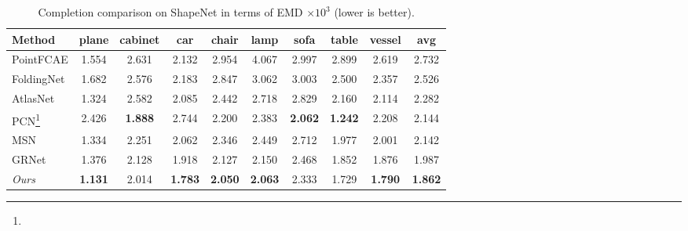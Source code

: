 \documentclass[final]{cvpr}
\begin{document}
\begin{table}
\begin{center}
\footnotesize
\setlength\tabcolsep{1.5pt}
\begin{tabular}{@{}l|cccccccc|c@{}}
\toprule
Method&plane&cabinet&car&chair&lamp&sofa&table&vessel&avg\\
\midrule
PointFCAE & 1.554 & 2.631 & 2.132 & 2.954 & 4.067 & 2.997 & 2.899 & 2.619 & 2.732\\
FoldingNet & 1.682 & 2.576 & 2.183 & 2.847 & 3.062 & 3.003 & 2.500 & 2.357 & 2.526 \\
AtlasNet & 1.324 & 2.582 & 2.085 & 2.442 & 2.718 & 2.829 & 2.160 & 2.114 & 2.282 \\
PCN\footnote{} & 2.426 & \textbf{1.888} & 2.744 & 2.200 & 2.383 & \textbf{2.062} & \textbf{1.242} & 2.208 & 2.144 \\
MSN & 1.334 & 2.251 & 2.062 & 2.346 & 2.449 & 2.712 & 1.977 & 2.001 & 2.142 \\
GRNet & 1.376 & 2.128 & 1.918 & 2.127 & 2.150 & 2.468 & 1.852 & 1.876 & 1.987 \\
\emph{Ours} & \textbf{1.131} & 2.014 & \textbf{1.783} & \textbf{2.050} & \textbf{2.063} & 2.333 & 1.729 & \textbf{1.790} & \textbf{1.862}\\
\bottomrule
\end{tabular}
\end{center}
\caption{Completion comparison on ShapeNet in terms of EMD $\times 10^3$ (lower is better).}
\label{table:shapenet_emd}
\end{table}

\end{document}
